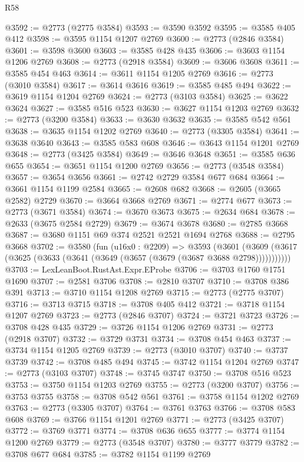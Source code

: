 \begin{lexlean}{R58}
\begin{coremodule}
@3592 := @2773 (@2775 @3584)
@3593 := @3590 @3592
@3595 := @3585 @405 @412
@3598 := @3595 @1154 @1207 @2769
@3600 := @2773 (@2846 @3584)
@3601 := @3598 @3600
@3603 := @3585 @428 @435
@3606 := @3603 @1154 @1206 @2769
@3608 := @2773 (@2918 @3584)
@3609 := @3606 @3608
@3611 := @3585 @454 @463
@3614 := @3611 @1154 @1205 @2769
@3616 := @2773 (@3010 @3584)
@3617 := @3614 @3616
@3619 := @3585 @485 @494
@3622 := @3619 @1154 @1204 @2769
@3624 := @2773 (@3103 @3584)
@3625 := @3622 @3624
@3627 := @3585 @516 @523
@3630 := @3627 @1154 @1203 @2769
@3632 := @2773 (@3200 @3584)
@3633 := @3630 @3632
@3635 := @3585 @542 @561
@3638 := @3635 @1154 @1202 @2769
@3640 := @2773 (@3305 @3584)
@3641 := @3638 @3640
@3643 := @3585 @583 @608
@3646 := @3643 @1154 @1201 @2769
@3648 := @2773 (@3425 @3584)
@3649 := @3646 @3648
@3651 := @3585 @636 @655
@3654 := @3651 @1154 @1200 @2769
@3656 := @2773 (@3548 @3584)
@3657 := @3654 @3656
@3661 := @2742 @2729 @3584 @677 @684
@3664 := @3661 @1154 @1199 @2584
@3665 := @2608 @682
@3668 := @2605 (@3665 @2582) @2729
@3670 := @3664 @3668 @2769
@3671 := @2774 @677
@3673 := @2773 (@3671 @3584)
@3674 := @3670 @3673
@3675 := @2634 @684
@3678 := @2633 (@3675 @2584 @2729)
@3679 := @3674 @3678
@3680 := @2785 @3668
@3687 := @3680 @1151 @69 @374 @2521 @2521 @1694 @2768
@3688 := @2795 @3668
@3702 := @3580
    (fun (u16x0 : @2209) =>
    @3593
      (@3601 (@3609 (@3617 (@3625 (@3633 (@3641 (@3649 (@3657 (@3679 (@3687 @3688 @2798)))))))))))
@3703 := LexLeanBoot.RustAst.Expr.EProbe
@3706 := @3703 @1760 @1751 @1690
@3707 := @2581 @3706
@3708 := @2810 @3707
@3710 := @3708 @386 @391
@3713 := @3710 @1154 @1208 @2769
@3715 := @2773 (@2775 @3707)
@3716 := @3713 @3715
@3718 := @3708 @405 @412
@3721 := @3718 @1154 @1207 @2769
@3723 := @2773 (@2846 @3707)
@3724 := @3721 @3723
@3726 := @3708 @428 @435
@3729 := @3726 @1154 @1206 @2769
@3731 := @2773 (@2918 @3707)
@3732 := @3729 @3731
@3734 := @3708 @454 @463
@3737 := @3734 @1154 @1205 @2769
@3739 := @2773 (@3010 @3707)
@3740 := @3737 @3739
@3742 := @3708 @485 @494
@3745 := @3742 @1154 @1204 @2769
@3747 := @2773 (@3103 @3707)
@3748 := @3745 @3747
@3750 := @3708 @516 @523
@3753 := @3750 @1154 @1203 @2769
@3755 := @2773 (@3200 @3707)
@3756 := @3753 @3755
@3758 := @3708 @542 @561
@3761 := @3758 @1154 @1202 @2769
@3763 := @2773 (@3305 @3707)
@3764 := @3761 @3763
@3766 := @3708 @583 @608
@3769 := @3766 @1154 @1201 @2769
@3771 := @2773 (@3425 @3707)
@3772 := @3769 @3771
@3774 := @3708 @636 @655
@3777 := @3774 @1154 @1200 @2769
@3779 := @2773 (@3548 @3707)
@3780 := @3777 @3779
@3782 := @3708 @677 @684
@3785 := @3782 @1154 @1199 @2769

\end{coremodule}
\end{lexlean}
